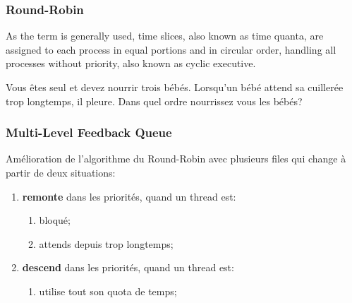 \documentclass{article}
\begin{document}
\subsubsection*{Round-Robin}
\begin{definition}
    As the term is generally used, time slices, also known as time quanta, are assigned to each process in equal portions and in circular order, handling all processes without priority, also known as cyclic executive.
    \begin{example}
        Vous êtes seul et devez nourrir trois bébés. Lorsqu'un bébé attend sa cuillerée trop longtemps, il pleure. Dans quel ordre nourrissez vous les bébés? 
    \end{example}
\end{definition}

\subsubsection*{Multi-Level Feedback Queue}
\begin{definition}
    Amélioration de l'algorithme du Round-Robin avec plusieurs files qui change à partir de deux situations:
    \begin{enumerate}[noitemsep]
        \item \textbf{remonte} dans les priorités, quand un thread est:
        \begin{enumerate}[noitemsep]
            \item bloqué;
            \item attends depuis trop longtemps;
        \end{enumerate}
        \item \textbf{descend} dans les priorités, quand un thread est:
        \begin{enumerate}[noitemsep]
            \item utilise tout son quota de temps;
        \end{enumerate}
    \end{enumerate}
\end{definition}
\end{document}
